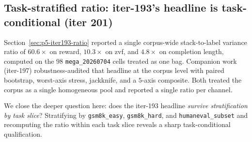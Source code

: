 \subsection{Task-stratified ratio: iter-193's headline is task-conditional (iter 201)}
\label{sec:p5-iter201-task-stratified}

Section~\ref{sec:p5-iter193-ratio} reported a single corpus-wide
stack-to-label variance ratio of $60.6\times$ on reward,
$10.3\times$ on zvf, and $4.8\times$ on completion length, computed
on the $98$ \texttt{mega\_20260704} cells treated as one bag.
Companion work (iter-197) robustness-audited that headline at the
corpus level with paired bootstrap, worst-axis stress, jackknife,
and a $5$-axis composite. Both treated the corpus as a single
homogeneous pool and reported a single ratio per channel.

We close the deeper question here: does the iter-193 headline
\emph{survive stratification by task slice}? Stratifying by
\texttt{gsm8k\_easy}, \texttt{gsm8k\_hard}, and
\texttt{humaneval\_subset} and recomputing the ratio within each
task slice reveals a sharp task-conditional qualification.

